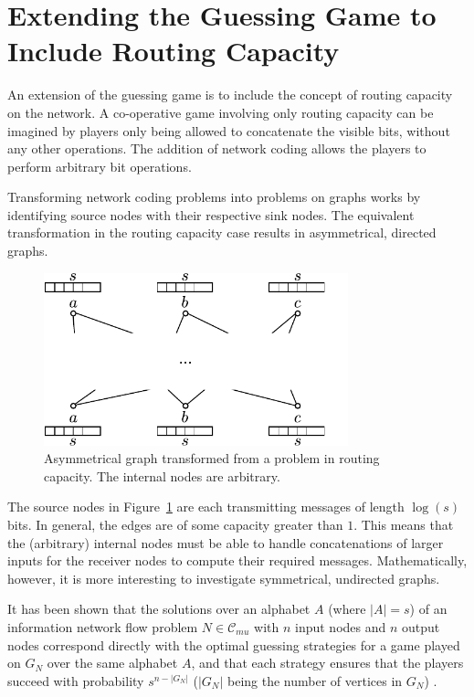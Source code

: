\section{Extending the Guessing Game to Include Routing Capacity}
\label{sect:rgg}

An extension of the guessing game is to include the concept of routing capacity on the network. A co-operative game involving only routing capacity can be imagined by players only being allowed to concatenate the visible bits, without any other operations. The addition of network coding allows the players to perform arbitrary bit operations.

Transforming network coding problems into problems on graphs works by identifying source nodes with their respective sink nodes. The equivalent transformation in the routing capacity case results in asymmetrical, directed graphs.

\begin{figure}[ht]
	\centering
	\includegraphics[width=250pt]{figures/asymm.pdf}
	\caption[Asymmetrical graph from a routing capacity problem]{Asymmetrical graph transformed from a problem in routing capacity. The internal nodes are arbitrary.}
	\label{asymm}
\end{figure}

The source nodes in Figure~\ref{asymm} are each transmitting messages of length $\log(s)$ bits. In general, the edges are of some capacity greater than $1$. This means that the (arbitrary) internal nodes must be able to handle concatenations of larger inputs for the receiver nodes to compute their required messages. Mathematically, however, it is more interesting to investigate symmetrical, undirected graphs.

It has been shown that the solutions over an alphabet $A$ (where $|A| = s$) of an information network flow problem $N \in \mathcal{C}_{mu}$ with $n$ input nodes and $n$ output nodes correspond directly with the optimal guessing strategies for a game played on $G_N$ over the same alphabet $A$, and that each strategy ensures that the players succeed with probability $s^{n - |G_N|}$ ($|G_N|$ being the number of vertices in $G_N$) \cite{riis2005util, riis2005info}.

